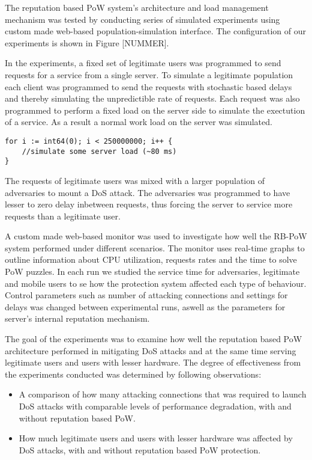 The reputation based PoW system's architecture and load management mechanism was tested by conducting series of simulated experiments using custom made web-based population-simulation interface. The configuration of our experiments is shown in Figure [NUMMER].

In the experiments, a fixed set of legitimate users was programmed to send requests for a service from a single server. To simulate a legitimate population each client was programmed to send the requests with stochastic based delays and thereby simulating the unpredictible rate of requests. Each request was also programmed to perform a fixed load on the server side to simulate the exectution of a service. As a result a normal work load on the server was simulated. 
\begin{verbatim}	
for i := int64(0); i < 250000000; i++ {
	//simulate some server load (~80 ms)
}
\end{verbatim}
The requests of legitimate users was mixed with a larger population of adversaries to mount a DoS attack. The adversaries was programmed to have lesser to zero delay inbetween requests, thus forcing the server to service more requests than a legitimate user. 

A custom made web-based monitor was used to investigate how well the RB-PoW system performed under different scenarios. The monitor uses real-time graphs to outline information about CPU utilization, requests rates and the time to solve PoW puzzles. In each run we studied the service time for adversaries, legitimate and mobile users to se how the protection system affected each type of behaviour. Control parameters such as number of attacking connections and settings for delays was changed between experimental runs, aswell as the parameters for server's internal reputation mechanism.

The goal of the experiments was to examine how well the reputation based PoW architecture performed in mitigating DoS attacks and at the same time serving legitimate users and users with lesser hardware. The degree of effectiveness from the experiments conducted was determined by following observations:

\begin{itemize}
\item A comparison of how many attacking connections that was required to launch DoS attacks with comparable levels of performance degradation, with and without reputation based PoW.

\item How much legitimate users and users with lesser hardware was affected by DoS attacks, with and without reputation based PoW protection.
\end{itemize}

